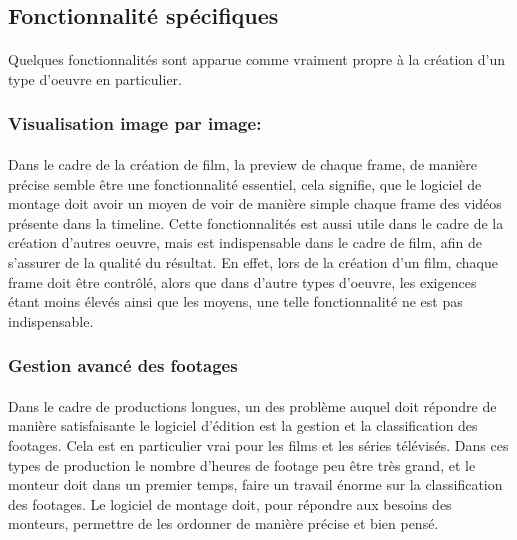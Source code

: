 \subsection{Fonctionnalité spécifiques}

\paragraph{}
Quelques fonctionnalités sont apparue comme vraiment propre à la création
d'un type d'oeuvre en particulier.

\subsubsection{Visualisation image par image:}
\paragraph{}
Dans le cadre de la création de film, la preview de chaque frame,
de manière précise semble être une fonctionnalité essentiel,
cela signifie, que le logiciel de montage doit avoir un moyen de
voir de manière simple chaque frame des vidéos présente dans la
timeline. Cette fonctionnalités est aussi utile dans le cadre de
la création d'autres oeuvre, mais est indispensable dans le cadre
de film, afin de s'assurer de la qualité du résultat. En effet,
lors de la création d'un film, chaque frame doit être contrôlé,
alors que dans d'autre types d'oeuvre, les exigences étant moins
élevés ainsi que les moyens, une telle fonctionnalité ne est pas
indispensable.

\subsubsection{Gestion avancé des footages}
\paragraph{}
Dans le cadre de productions longues, un des problème auquel doit répondre de
manière satisfaisante le logiciel d'édition est la gestion et la classification
des footages. Cela est en particulier vrai pour les films et les séries télévisés.
Dans ces types de production le nombre d'heures de footage peu être très grand, et
le monteur doit dans un premier temps, faire un travail énorme sur la classification
des footages. Le logiciel de montage doit, pour répondre aux besoins des monteurs,
permettre de les ordonner de manière précise et bien pensé.

